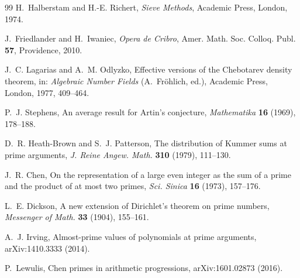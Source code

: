 \documentclass[11pt]{article}
\theoremstyle{plain}
\theoremstyle{definition}
\theoremstyle{remark}
\begin{document}
\begin{thebibliography}{99}
 H.~Halberstam and H.-E. Richert, \emph{Sieve Methods},
Academic Press, London, 1974.

 J.~Friedlander and H.~Iwaniec, \emph{Opera de Cribro},
Amer. Math. Soc. Colloq. Publ. \textbf{57}, Providence, 2010.

 J.~C. Lagarias and A.~M. Odlyzko, Effective versions of
the Chebotarev density theorem, in: \emph{Algebraic Number Fields}
(A.~Fr\"ohlich, ed.), Academic Press, London, 1977, 409--464.

 P.~J. Stephens, An average result for Artin's
conjecture, \emph{Mathematika} \textbf{16} (1969), 178--188.

 D.~R. Heath-Brown and S.~J. Patterson, The distribution
of Kummer sums at prime arguments, \emph{J. Reine Angew. Math.}
\textbf{310} (1979), 111--130.

 J.~R. Chen, On the representation of a large even
integer as the sum of a prime and the product of at most two primes,
\emph{Sci. Sinica} \textbf{16} (1973), 157--176.

 L.~E. Dickson, A new extension of Dirichlet's
theorem on prime numbers, \emph{Messenger of Math.} \textbf{33} (1904),
155--161.

 A.~J. Irving, Almost-prime values of polynomials at
prime arguments, arXiv:1410.3333 (2014).

 P.~Lewulis, Chen primes in arithmetic progressions,
arXiv:1601.02873 (2016).

\end{thebibliography}
\end{document}
